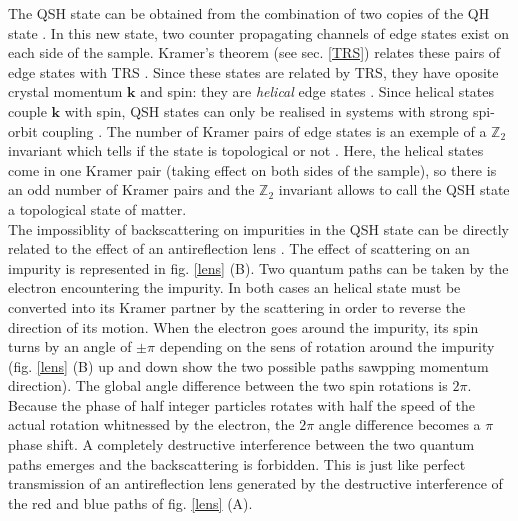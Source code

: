 The QSH state can be obtained from the combination of two copies of the QH state \cite{buhmann_quantum_2011}. In this new state, two counter propagating channels of edge states exist on each side of the sample. Kramer's theorem (see sec. \ref{TRS}) relates these pairs of edge states with TRS \cite{buhmann_quantum_2011}. Since these states are related by TRS, they have oposite crystal momentum $\mathbf{k}$ and spin: they are \textit{helical} edge states \cite{bernevig_topological_2013}. Since helical states couple $\mathbf{k}$ with spin, QSH states can only be realised in systems with strong spi-orbit coupling \cite{qi_quantum_2010}. The number of Kramer pairs of edge states is an exemple of a $\mathbb{Z}_2$ invariant which tells if the state is topological or not \cite{koenig_quantum_2008}. Here, the helical states come in one Kramer pair (taking effect on both sides of the sample), so there is an odd number of Kramer pairs and the $\mathbb{Z}_2$ invariant allows to call the QSH state a topological state of matter.\\

The impossiblity of backscattering on impurities in the QSH state can be directly related to the effect of an antireflection lens \cite{qi_quantum_2010}. The effect of scattering on an impurity is represented in fig. \ref{lens} (B). Two quantum paths can be taken by the electron encountering the impurity. In both cases an helical state must be converted into its Kramer partner by the scattering in order to reverse the direction of its motion. When the electron goes around the impurity, its spin turns by an angle of $\pm \pi$ depending on the sens of rotation around the impurity (fig. \ref{lens} (B) up and down show the two possible paths sawpping momentum direction). The global angle difference between the two spin rotations is $2\pi$. Because the phase of half integer particles rotates with half the speed of the actual rotation whitnessed by the electron, the $2\pi$ angle difference becomes a $\pi$ phase shift. A completely destructive interference between the two quantum paths emerges and the backscattering is forbidden. This is just like perfect transmission of an antireflection lens generated by the destructive interference of the red and blue paths of fig. \ref{lens} (A). 

